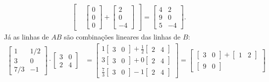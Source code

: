 \documentclass[12pt,a4paper]{article}
\begin{document}
\begin{enumerate}
\begin{enumerate}
\begin{align*}
\begin{bmatrix}
&
\begin{bmatrix}
0 \\
0 \\
0
\end{bmatrix}
+
\begin{bmatrix}
2 \\
0 \\
-4
\end{bmatrix}
\end{bmatrix}
=
\begin{bmatrix}
4 & 2 \\
9 & 0 \\
5 & -4
\end{bmatrix}.
\end{align*}
Já as linhas de $AB$ são combinações lineares das linhas de $B$:
\begin{align*}
\begin{bmatrix}
  1 & 1/2 \\
  3 & 0 \\
7/3 & -1
\end{bmatrix}
\cdot
\begin{bmatrix}
3 & 0 \\
2 & 4
\end{bmatrix}
& =
\begin{bmatrix}
1
\begin{bmatrix}
3 & 0
\end{bmatrix}
+\frac{1}{2}
\begin{bmatrix}
2 & 4
\end{bmatrix}
\\
3
\begin{bmatrix}
3 & 0
\end{bmatrix}
+0\begin{bmatrix}
2 & 4
\end{bmatrix}\\
\frac{7}{3}
\begin{bmatrix}
3 & 0
\end{bmatrix}
-1\begin{bmatrix}
2 & 4
\end{bmatrix}
\end{bmatrix}
=
\begin{bmatrix}
\begin{bmatrix}
3 & 0
\end{bmatrix}
+
\begin{bmatrix}
1 & 2
\end{bmatrix}
\\
\begin{bmatrix}
9 & 0
\end{bmatrix}

\end{bmatrix}
\end{align*}
\end{enumerate}
\end{enumerate}
\end{document}
